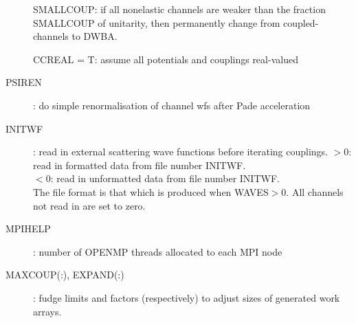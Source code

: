 \documentclass[11pt]{article}
\begin{document}
\begin{description}
SMALLCOUP: if all nonelastic channels are weaker than the fraction
SMALLCOUP of unitarity, then permanently change from coupled-channels to DWBA.

CCREAL = T: assume all potentials and couplings real-valued

\item[PSIREN]: do simple renormalisation of channel wfs after Pade acceleration
\item[INITWF]: read in external scattering wave functions before iterating couplings.
$> 0$: read in formatted data from file number INITWF.\\
$< 0$: read in unformatted data from file number INITWF.\\
The file format is that which is produced when WAVES$>0$. 
All channels not read in are set to zero.

\item[MPIHELP]: number of OPENMP threads allocated to each MPI node

\item[MAXCOUP(:), EXPAND(:)]: fudge limits and factors (respectively) to adjust sizes of generated work arrays.

\end{description}
\end{document}
